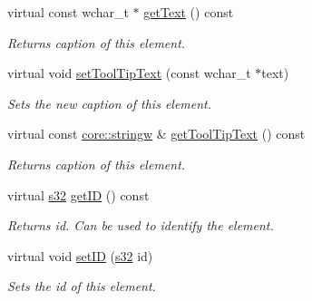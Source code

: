 \begin{DoxyCompactItemize}
virtual const wchar\+\_\+t $\ast$ \hyperlink{classirr_1_1gui_1_1IGUIElement_addaba768aba8a3e9d77b8ade88f05e13}{get\+Text} () const
\begin{DoxyCompactList}\small\item\em Returns caption of this element. \end{DoxyCompactList}\item 
\mbox{\label{classirr_1_1gui_1_1IGUIElement_a672f29f88c8d8f1e8ed1ac6c9f23b890}} 
virtual void \hyperlink{classirr_1_1gui_1_1IGUIElement_a672f29f88c8d8f1e8ed1ac6c9f23b890}{set\+Tool\+Tip\+Text} (const wchar\+\_\+t $\ast$text)
\begin{DoxyCompactList}\small\item\em Sets the new caption of this element. \end{DoxyCompactList}\item 
\mbox{\label{classirr_1_1gui_1_1IGUIElement_a9c19741dd210443b750e02ef7d639cf8}} 
virtual const \hyperlink{namespaceirr_1_1core_a5aedb62cb47cf01d1c548ab5e6344d2d}{core\+::stringw} \& \hyperlink{classirr_1_1gui_1_1IGUIElement_a9c19741dd210443b750e02ef7d639cf8}{get\+Tool\+Tip\+Text} () const
\begin{DoxyCompactList}\small\item\em Returns caption of this element. \end{DoxyCompactList}\item 
\mbox{\label{classirr_1_1gui_1_1IGUIElement_af838c5de4a09e09a89de74d67d07d80c}} 
virtual \hyperlink{namespaceirr_ac66849b7a6ed16e30ebede579f9b47c6}{s32} \hyperlink{classirr_1_1gui_1_1IGUIElement_af838c5de4a09e09a89de74d67d07d80c}{get\+ID} () const
\begin{DoxyCompactList}\small\item\em Returns id. Can be used to identify the element. \end{DoxyCompactList}\item 
\mbox{\label{classirr_1_1gui_1_1IGUIElement_a55bad0e14306765e1fb734c56b729ba4}} 
virtual void \hyperlink{classirr_1_1gui_1_1IGUIElement_a55bad0e14306765e1fb734c56b729ba4}{set\+ID} (\hyperlink{namespaceirr_ac66849b7a6ed16e30ebede579f9b47c6}{s32} id)
\begin{DoxyCompactList}\small\item\em Sets the id of this element. \end{DoxyCompactList}\item 

\end{DoxyCompactItemize}
